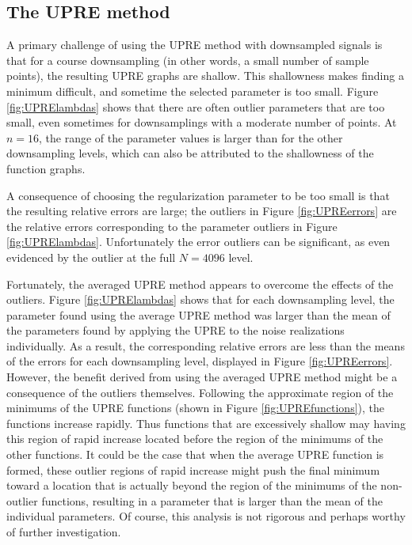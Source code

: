 \documentclass[12pt]{article}
\begin{document}
\subsection{The UPRE method} \label{The UPRE method}
A primary challenge of using the UPRE method with downsampled signals is that for a course downsampling (in other words, a small number of sample points), the resulting UPRE graphs are shallow. This shallowness makes finding a minimum difficult, and sometime the selected parameter is too small. Figure \ref{fig:UPRElambdas} shows that there are often outlier parameters that are too small, even sometimes for downsamplings with a moderate number of points. At $n = 16$, the range of the parameter values is larger than for the other downsampling levels, which can also be attributed to the shallowness of the function graphs. \par 
A consequence of choosing the regularization parameter to be too small is that the resulting relative errors are large; the outliers in Figure \ref{fig:UPREerrors} are the relative errors corresponding to the parameter outliers in Figure \ref{fig:UPRElambdas}. Unfortunately the error outliers can be significant, as even evidenced by the outlier at the full $N = 4096$ level. \par 
Fortunately, the averaged UPRE method appears to overcome the effects of the outliers. Figure \ref{fig:UPRElambdas} shows that for each downsampling level, the parameter found using the average UPRE method was larger than the mean of the parameters found by applying the UPRE to the noise realizations individually. As a result, the corresponding relative errors are less than the means of the errors for each downsampling level, displayed in Figure \ref{fig:UPREerrors}. However, the benefit derived from using the averaged UPRE method might be a consequence of the outliers themselves. Following the approximate region of the minimums of the UPRE functions (shown in Figure \ref{fig:UPREfunctions}), the functions increase rapidly. Thus functions that are excessively shallow may having this region of rapid increase located before the region of the minimums of the other functions. It could be the case that when the average UPRE function is formed, these outlier regions of rapid increase might push the final minimum toward a location that is actually beyond the region of the minimums of the non-outlier functions, resulting in a parameter that is larger than the mean of the individual parameters. Of course, this analysis is not rigorous and perhaps worthy of further investigation. 
\end{document}
